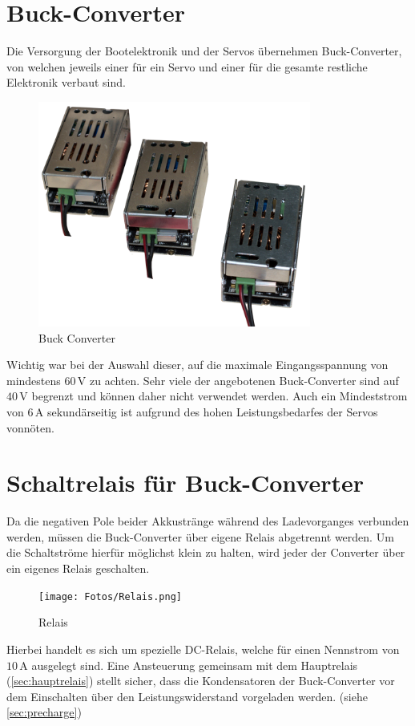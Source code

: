 \section{Buck-Converter}
Die Versorgung der Bootelektronik und der Servos übernehmen Buck-Converter, von welchen jeweils einer für ein Servo und einer für die gesamte restliche Elektronik verbaut sind.
\begin{figure}[h]
    \centering
    \includegraphics[width=0.8\textwidth]{Fotos/Buck_Converter.png}
    \caption{Buck Converter}
\end{figure}

Wichtig war bei der Auswahl dieser, auf die maximale Eingangsspannung von mindestens $60\,\mathrm{V}$ zu achten. Sehr viele der angebotenen Buck-Converter sind auf $40\,\mathrm{V}$ begrenzt und können daher nicht verwendet werden.
Auch ein Mindeststrom von $6\,\mathrm{A}$ sekundärseitig ist aufgrund des hohen Leistungsbedarfes der Servos vonnöten. 
\newpage

\section{Schaltrelais für Buck-Converter}
Da die negativen Pole beider Akkustränge während des Ladevorganges verbunden werden, müssen die Buck-Converter über eigene Relais abgetrennt werden. 
Um die Schaltströme hierfür möglichst klein zu halten, wird jeder der Converter über ein eigenes Relais geschalten.
\begin{figure}[h]
    \centering
    \texttt{[image: Fotos/Relais.png]}
    \caption{Relais}
\end{figure}

Hierbei handelt es sich um spezielle DC-Relais, welche für einen Nennstrom von $10\,\mathrm{A}$ ausgelegt sind.
Eine Ansteuerung gemeinsam mit dem Hauptrelais (\ref{sec:hauptrelais}) stellt sicher, dass die Kondensatoren der Buck-Converter vor dem Einschalten über den Leistungswiderstand vorgeladen werden. (siehe \autoref{sec:precharge})

